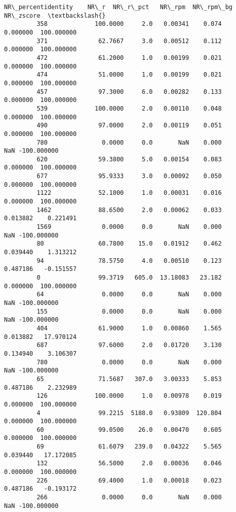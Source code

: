 \documentclass[11pt]{article}
\begin{document}
\begin{Verbatim}[commandchars=\\\{\}]
               NR\_percentidentity    NR\_r  NR\_r\_pct   NR\_rpm  NR\_rpm\_bg   NR\_zscore  \textbackslash{}
         358             100.0000     2.0   0.00341    0.074   0.000000  100.000000   
         371              62.7667     3.0   0.00512    0.112   0.000000  100.000000   
         472              61.2000     1.0   0.00199    0.021   0.000000  100.000000   
         474              51.0000     1.0   0.00199    0.021   0.000000  100.000000   
         457              97.3000     6.0   0.00282    0.133   0.000000  100.000000   
         539             100.0000     2.0   0.00110    0.048   0.000000  100.000000   
         490              97.0000     2.0   0.00119    0.051   0.000000  100.000000   
         780               0.0000     0.0       NaN    0.000        NaN -100.000000   
         620              59.3800     5.0   0.00154    0.083   0.000000  100.000000   
         677              95.9333     3.0   0.00092    0.050   0.000000  100.000000   
         1122             52.1000     1.0   0.00031    0.016   0.000000  100.000000   
         1462             88.6500     2.0   0.00062    0.033   0.013882    0.221491   
         1569              0.0000     0.0       NaN    0.000        NaN -100.000000   
         80               60.7800    15.0   0.01912    0.462   0.039440    1.313212   
         94               78.5750     4.0   0.00510    0.123   0.487186   -0.151557   
         0                99.3719   605.0  13.18083   23.182   0.000000  100.000000   
         64                0.0000     0.0       NaN    0.000        NaN -100.000000   
         155               0.0000     0.0       NaN    0.000        NaN -100.000000   
         404              61.9000     1.0   0.00860    1.565   0.013882   17.970124   
         687              97.6000     2.0   0.01720    3.130   0.134940    3.106307   
         780               0.0000     0.0       NaN    0.000        NaN -100.000000   
         65               71.5687   307.0   3.00333    5.853   0.487186    2.232989   
         126             100.0000     1.0   0.00978    0.019   0.000000  100.000000   
         4                99.2215  5188.0   0.93809  120.804   0.000000  100.000000   
         60               99.0500    26.0   0.00470    0.605   0.000000  100.000000   
         69               61.6079   239.0   0.04322    5.565   0.039440   17.172085   
         132              56.5000     2.0   0.00036    0.046   0.000000  100.000000   
         226              69.4000     1.0   0.00018    0.023   0.487186   -0.193172   
         266               0.0000     0.0       NaN    0.000        NaN -100.000000   

\end{Verbatim}
\end{document}
